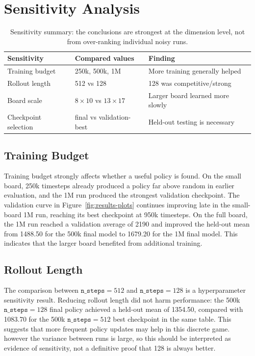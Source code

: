 \documentclass[10pt,a4paper]{article}
\begin{document}
\section{Sensitivity Analysis}

\begin{table}[H]
\centering
\caption{Sensitivity summary: the conclusions are strongest at the dimension level, not from over-ranking individual noisy runs.}
\label{tab:sensitivity-summary}
\small
\begin{tabular}{lll}
\toprule
Sensitivity & Compared values & Finding \\
\midrule
Training budget & 250k, 500k, 1M & More training generally helped \\
Rollout length & 512 vs 128 & 128 was competitive/strong \\
Board scale & \(8\times10\) vs \(13\times17\) & Larger board learned more slowly \\
Checkpoint selection & final vs validation-best & Held-out testing is necessary \\
\bottomrule
\end{tabular}
\end{table}

\subsection{Training Budget}

Training budget strongly affects whether a useful policy is found. On the small board, 250k timesteps already produced a policy far above random in earlier evaluation, and the 1M run produced the strongest validation checkpoint. The validation curve in Figure~\ref{fig:results-plots} continues improving late in the small-board 1M run, reaching its best checkpoint at 950k timesteps. On the full board, the 1M run reached a validation average of 2190 and improved the held-out mean from 1488.50 for the 500k final model to 1679.20 for the 1M final model. This indicates that the larger board benefited from additional training.

\subsection{Rollout Length}

The comparison between \(\texttt{n\_steps}=512\) and \(\texttt{n\_steps}=128\) is a hyperparameter sensitivity result. Reducing rollout length did not harm performance: the 500k \(\texttt{n\_steps}=128\) final policy achieved a held-out mean of 1354.50, compared with 1083.70 for the 500k \(\texttt{n\_steps}=512\) best checkpoint in the same table. This suggests that more frequent policy updates may help in this discrete game. however the variance between runs is large, so this should be interpreted as evidence of sensitivity, not a definitive proof that 128 is always better.
\end{document}
